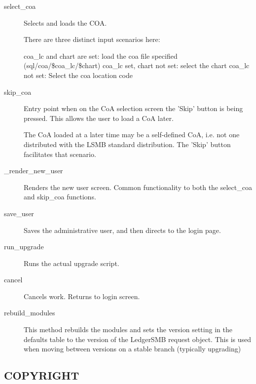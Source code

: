 \begin{description}
\begin{description}
\item[{select\_coa}] \mbox{}

Selects and loads the COA.



There are three distinct input scenarios here:



coa\_lc and chart are set:  load the coa file specified (sql/coa/\$coa\_lc/\$chart)
coa\_lc set, chart not set:  select the chart
coa\_lc not set:  Select the coa location code


\item[{skip\_coa}] \mbox{}

Entry point when on the CoA selection screen the 'Skip' button
is being pressed.  This allows the user to load a CoA later.



The CoA loaded at a later time may be a self-defined CoA, i.e. not
one distributed with the LSMB standard distribution.  The 'Skip'
button facilitates that scenario.


\item[{\_render\_new\_user}] \mbox{}

Renders the new user screen. Common functionality to both the
select\_coa and skip\_coa functions.


\item[{save\_user}] \mbox{}

Saves the administrative user, and then directs to the login page.


\item[{run\_upgrade}] \mbox{}

Runs the actual upgrade script.


\item[{cancel}] \mbox{}

Cancels work.  Returns to login screen.


\item[{rebuild\_modules}] \mbox{}

This method rebuilds the modules and sets the version setting in the defaults
table to the version of the LedgerSMB request object.  This is used when moving
between versions on a stable branch (typically upgrading)

\end{description}
\subsection*{COPYRIGHT\label{LedgerSMB::Scripts::setup_COPYRIGHT}}



\end{description}
